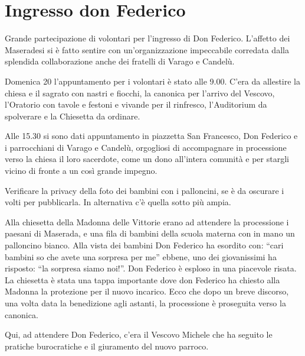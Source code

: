 \section{Ingresso don Federico}


Grande partecipazione di volontari per l'ingresso di Don Federico. L'affetto dei Maseradesi si è fatto sentire con un'organizzazione impeccabile corredata dalla splendida collaborazione anche dei fratelli di Varago e Candelù.


Domenica 20 l'appuntamento per i volontari è stato alle 9.00. C'era da allestire la chiesa e il sagrato con nastri e fiocchi, la canonica per l'arrivo del Vescovo, l'Oratorio con tavole e festoni e vivande per il rinfresco, l'Auditorium da spolverare e la Chiesetta da ordinare.


Alle 15.30 si sono dati appuntamento in piazzetta San Francesco, Don Federico e i parrocchiani di Varago e Candelù, orgogliosi di accompagnare in processione verso la chiesa il loro sacerdote, come un dono all'intera comunità e per stargli vicino di fronte a un così grande impegno.


Verificare la privacy della foto dei bambini con i palloncini, se è da oscurare i volti per pubblicarla.
In alternativa c'è quella sotto più ampia.


Alla chiesetta della Madonna delle Vittorie erano ad attendere la processione i paesani di Maserada, e una fila di bambini della scuola materna con in mano un palloncino bianco. Alla vista dei bambini Don Federico ha esordito con: ``cari bambini so che avete una sorpresa per me'' ebbene, uno dei giovanissimi ha risposto: ``la sorpresa siamo noi!''. Don Federico è esploso in una piacevole risata. La chiesetta è stata una tappa importante dove don Federico ha chiesto alla Madonna la protezione per il nuovo incarico. Ecco che dopo un breve discorso, una volta data la benedizione agli astanti, la processione è proseguita verso la canonica.

Qui, ad attendere Don Federico, c'era il Vescovo Michele che ha seguito le pratiche burocratiche e il giuramento del nuovo parroco.

